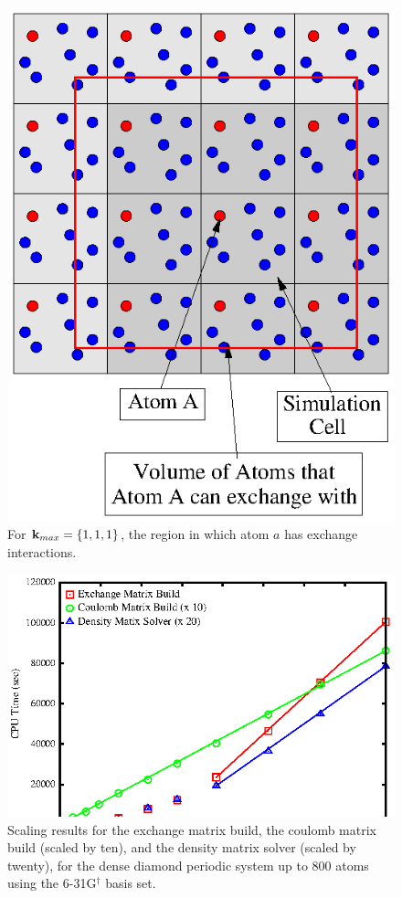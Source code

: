 \documentclass[prb,aps,nobibnotes,twocolumn,doublespace,twocolumngrid,superbib]{revtex4}
\begin{document}
\begin{figure}
\caption{For ${\bf k}_{max}=\{1,1,1\}$, the region in which atom $a$ has exchange interactions.}
\label{figure:ExchangeRegion_k111}
{\centering \includegraphics{ExchangeRegion_k111.ps} \par}
\end{figure}
%
%
%
\begin{figure}
\caption{Scaling results for the exchange matrix build, the coulomb matrix
build (scaled by ten), and the density matrix solver (scaled by twenty),  
for the dense diamond periodic system up to 800 atoms using the
6-31G$ ^\dagger$ basis set.}
\label{figure:Scaling_Matrix_Build}
{\centering \includegraphics{Timing_Diamond_ONX.ps} \par} 
\end{figure}
\end{document}
